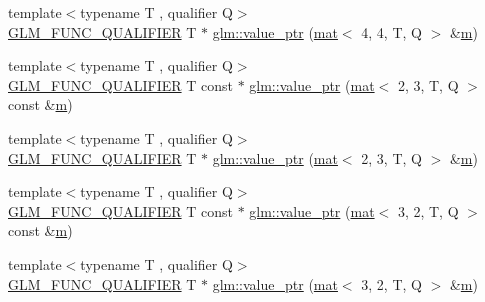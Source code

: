 \begin{DoxyCompactItemize}
{\footnotesize template$<$typename T , qualifier Q$>$ }\\\mbox{\hyperlink{setup_8hpp_a33fdea6f91c5f834105f7415e2a64407}{G\+L\+M\+\_\+\+F\+U\+N\+C\+\_\+\+Q\+U\+A\+L\+I\+F\+I\+ER}} T $\ast$ \mbox{\hyperlink{group__gtc__type__ptr_ga68a08cd646559275950123dfffbdaf55}{glm\+::value\+\_\+ptr}} (\mbox{\hyperlink{structglm_1_1mat}{mat}}$<$ 4, 4, T, Q $>$ \&\mbox{\hyperlink{_s_d_l__opengl__glext_8h_af593500c283bf1a787a6f947f503a5c2}{m}})
\item 
{\footnotesize template$<$typename T , qualifier Q$>$ }\\\mbox{\hyperlink{setup_8hpp_a33fdea6f91c5f834105f7415e2a64407}{G\+L\+M\+\_\+\+F\+U\+N\+C\+\_\+\+Q\+U\+A\+L\+I\+F\+I\+ER}} T const  $\ast$ \mbox{\hyperlink{group__gtc__type__ptr_ga2be1ab45c7a864986baac31557910adb}{glm\+::value\+\_\+ptr}} (\mbox{\hyperlink{structglm_1_1mat}{mat}}$<$ 2, 3, T, Q $>$ const \&\mbox{\hyperlink{_s_d_l__opengl__glext_8h_af593500c283bf1a787a6f947f503a5c2}{m}})
\item 
{\footnotesize template$<$typename T , qualifier Q$>$ }\\\mbox{\hyperlink{setup_8hpp_a33fdea6f91c5f834105f7415e2a64407}{G\+L\+M\+\_\+\+F\+U\+N\+C\+\_\+\+Q\+U\+A\+L\+I\+F\+I\+ER}} T $\ast$ \mbox{\hyperlink{group__gtc__type__ptr_gab420b07b29bb3bb1cec07b6c31725fef}{glm\+::value\+\_\+ptr}} (\mbox{\hyperlink{structglm_1_1mat}{mat}}$<$ 2, 3, T, Q $>$ \&\mbox{\hyperlink{_s_d_l__opengl__glext_8h_af593500c283bf1a787a6f947f503a5c2}{m}})
\item 
{\footnotesize template$<$typename T , qualifier Q$>$ }\\\mbox{\hyperlink{setup_8hpp_a33fdea6f91c5f834105f7415e2a64407}{G\+L\+M\+\_\+\+F\+U\+N\+C\+\_\+\+Q\+U\+A\+L\+I\+F\+I\+ER}} T const  $\ast$ \mbox{\hyperlink{group__gtc__type__ptr_ga0c9f0f561c848ec89d34977eff6a7b17}{glm\+::value\+\_\+ptr}} (\mbox{\hyperlink{structglm_1_1mat}{mat}}$<$ 3, 2, T, Q $>$ const \&\mbox{\hyperlink{_s_d_l__opengl__glext_8h_af593500c283bf1a787a6f947f503a5c2}{m}})
\item 
{\footnotesize template$<$typename T , qualifier Q$>$ }\\\mbox{\hyperlink{setup_8hpp_a33fdea6f91c5f834105f7415e2a64407}{G\+L\+M\+\_\+\+F\+U\+N\+C\+\_\+\+Q\+U\+A\+L\+I\+F\+I\+ER}} T $\ast$ \mbox{\hyperlink{group__gtc__type__ptr_gacd2f2c950912a073f6f77494df9e42a6}{glm\+::value\+\_\+ptr}} (\mbox{\hyperlink{structglm_1_1mat}{mat}}$<$ 3, 2, T, Q $>$ \&\mbox{\hyperlink{_s_d_l__opengl__glext_8h_af593500c283bf1a787a6f947f503a5c2}{m}})
\item 

\end{DoxyCompactItemize}

